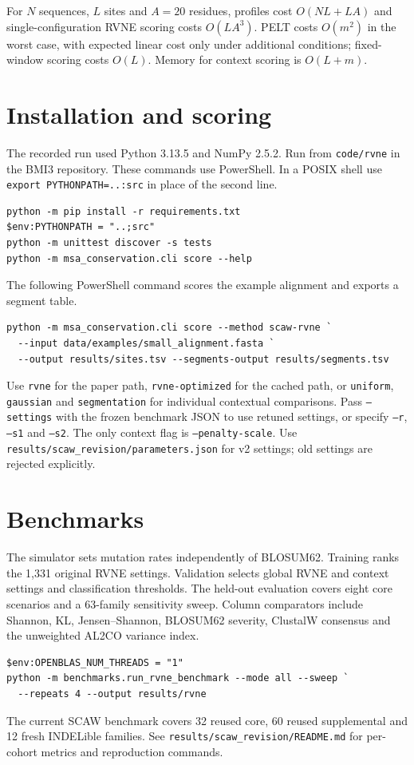 \documentclass[10pt,a4paper]{article}
\begin{document}
For \(N\) sequences, \(L\) sites and \(A=20\) residues, profiles cost \(O(NL+LA)\) and single-configuration RVNE scoring costs \(O(LA^3)\). PELT costs \(O(m^2)\) in the worst case, with expected linear cost only under additional conditions; fixed-window scoring costs \(O(L)\). Memory for context scoring is \(O(L+m)\).

\section{Installation and scoring}
The recorded run used Python 3.13.5 and NumPy 2.5.2. Run from \texttt{code/rvne} in the BMI3 repository. These commands use PowerShell. In a POSIX shell use \texttt{export PYTHONPATH=..:src} in place of the second line.
\begin{verbatim}
python -m pip install -r requirements.txt
$env:PYTHONPATH = "..;src"
python -m unittest discover -s tests
python -m msa_conservation.cli score --help
\end{verbatim}
\newpage
The following PowerShell command scores the example alignment and exports a segment table.
\begin{verbatim}
python -m msa_conservation.cli score --method scaw-rvne `
  --input data/examples/small_alignment.fasta `
  --output results/sites.tsv --segments-output results/segments.tsv
\end{verbatim}
Use \texttt{rvne} for the paper path, \texttt{rvne-optimized} for the cached path, or \texttt{uniform}, \texttt{gaussian} and \texttt{segmentation} for individual contextual comparisons. Pass \texttt{--settings} with the frozen benchmark JSON to use retuned settings, or specify \texttt{--r}, \texttt{--s1} and \texttt{--s2}. The only context flag is \texttt{--penalty-scale}. Use \texttt{results/scaw\_revision/parameters.json} for v2 settings; old settings are rejected explicitly.

\section{Benchmarks}
The simulator sets mutation rates independently of BLOSUM62. Training ranks the 1,331 original RVNE settings. Validation selects global RVNE and context settings and classification thresholds. The held-out evaluation covers eight core scenarios and a 63-family sensitivity sweep. Column comparators include Shannon, KL, Jensen--Shannon, BLOSUM62 severity, ClustalW consensus and the unweighted AL2CO variance index.
\begin{verbatim}
$env:OPENBLAS_NUM_THREADS = "1"
python -m benchmarks.run_rvne_benchmark --mode all --sweep `
  --repeats 4 --output results/rvne
\end{verbatim}
The current SCAW benchmark covers 32 reused core, 60 reused supplemental and 12 fresh INDELible families. See \texttt{results/scaw\_revision/README.md} for per-cohort metrics and reproduction commands.
\end{document}
